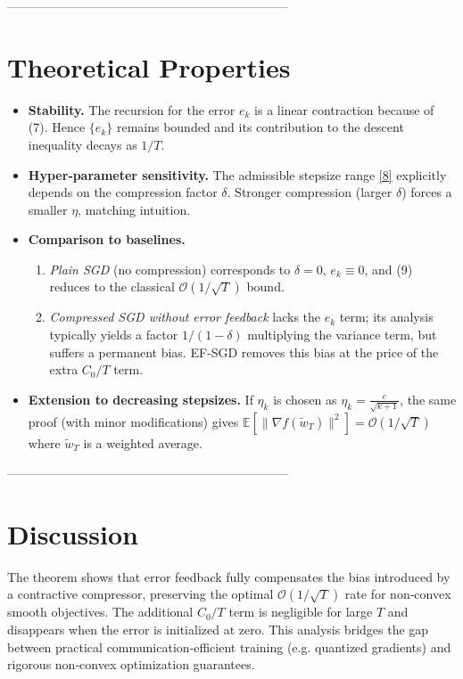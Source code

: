 \documentclass{article}
\begin{document}
--------------------------------------------------------------------

\section*{Theoretical Properties}
\begin{itemize}
\item \textbf{Stability.} The recursion for the error $e_k$ is a linear contraction because of (7). Hence $\{e_k\}$ remains bounded and its contribution to the descent inequality decays as $1/T$.
\item \textbf{Hyper‑parameter sensitivity.} The admissible stepsize range \eqref{8} explicitly depends on the compression factor $\delta$. Stronger compression (larger $\delta$) forces a smaller $\eta$, matching intuition.
\item \textbf{Comparison to baselines.}
    \begin{enumerate}
        \item \emph{Plain SGD} (no compression) corresponds to $\delta=0$, $e_k\equiv0$, and (9) reduces to the classical $\mathcal{O}(1/\sqrt{T})$ bound.
        \item \emph{Compressed SGD without error feedback} lacks the $e_k$ term; its analysis typically yields a factor $1/(1-\delta)$ multiplying the variance term, but suffers a permanent bias. EF‑SGD removes this bias at the price of the extra $C_0/T$ term.
    \end{enumerate}
\item \textbf{Extension to decreasing stepsizes.} If $\eta_k$ is chosen as $\eta_k = \frac{c}{\sqrt{k+1}}$, the same proof (with minor modifications) gives $\mathbb{E}[\|\nabla f(\tilde w_T)\|^2]=\mathcal{O}(1/\sqrt{T})$ where $\tilde w_T$ is a weighted average.
\end{itemize}

--------------------------------------------------------------------

\section*{Discussion}
The theorem shows that error feedback fully compensates the bias introduced by a contractive compressor, preserving the optimal $\mathcal{O}(1/\sqrt{T})$ rate for non‑convex smooth objectives. The additional $C_0/T$ term is negligible for large $T$ and disappears when the error is initialized at zero. This analysis bridges the gap between practical communication‑efficient training (e.g. quantized gradients) and rigorous non‑convex optimization guarantees.
\end{document}
